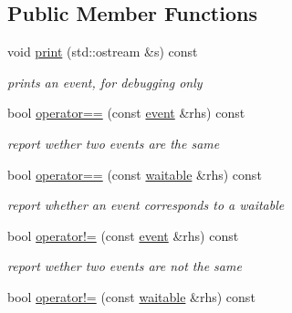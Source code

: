 \subsection*{Public Member Functions}
\begin{DoxyCompactItemize}
\item 
void \hyperlink{class_r_t_o_s_1_1event_af3a6450c08560383db9f34b3d826d126}{print} (std\+::ostream \&s) const \hypertarget{class_r_t_o_s_1_1event_af3a6450c08560383db9f34b3d826d126}{}\label{class_r_t_o_s_1_1event_af3a6450c08560383db9f34b3d826d126}

\begin{DoxyCompactList}\small\item\em prints an event, for debugging only \end{DoxyCompactList}\item 
bool \hyperlink{class_r_t_o_s_1_1event_ad8d6bd84ac8374c4ab9f9eb8579face0}{operator==} (const \hyperlink{class_r_t_o_s_1_1event}{event} \&rhs) const \hypertarget{class_r_t_o_s_1_1event_ad8d6bd84ac8374c4ab9f9eb8579face0}{}\label{class_r_t_o_s_1_1event_ad8d6bd84ac8374c4ab9f9eb8579face0}

\begin{DoxyCompactList}\small\item\em report wether two events are the same \end{DoxyCompactList}\item 
bool \hyperlink{class_r_t_o_s_1_1event_a2ecee9deb0913822b19ae609256fa685}{operator==} (const \hyperlink{class_r_t_o_s_1_1waitable}{waitable} \&rhs) const \hypertarget{class_r_t_o_s_1_1event_a2ecee9deb0913822b19ae609256fa685}{}\label{class_r_t_o_s_1_1event_a2ecee9deb0913822b19ae609256fa685}

\begin{DoxyCompactList}\small\item\em report whether an event corresponds to a waitable \end{DoxyCompactList}\item 
bool \hyperlink{class_r_t_o_s_1_1event_a7d5e26e1dcd4f4d43cc569188ae4ed12}{operator!=} (const \hyperlink{class_r_t_o_s_1_1event}{event} \&rhs) const \hypertarget{class_r_t_o_s_1_1event_a7d5e26e1dcd4f4d43cc569188ae4ed12}{}\label{class_r_t_o_s_1_1event_a7d5e26e1dcd4f4d43cc569188ae4ed12}

\begin{DoxyCompactList}\small\item\em report wether two events are not the same \end{DoxyCompactList}\item 
bool \hyperlink{class_r_t_o_s_1_1event_a27d10417a15cbb38daca2e7bd3a6a1eb}{operator!=} (const \hyperlink{class_r_t_o_s_1_1waitable}{waitable} \&rhs) const \hypertarget{class_r_t_o_s_1_1event_a27d10417a15cbb38daca2e7bd3a6a1eb}{}\label{class_r_t_o_s_1_1event_a27d10417a15cbb38daca2e7bd3a6a1eb}


\end{DoxyCompactItemize}

